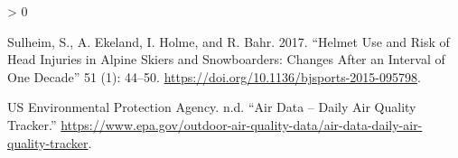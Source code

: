 \documentclass[
]{report}
\newlength{\cslhangindent}
\newenvironment{CSLReferences}[2] %
 {%
  \setlength{\parindent}{0pt}
  \ifodd #1 \everypar{\setlength{\hangindent}{\cslhangindent}}\ignorespaces\fi
  \ifnum #2 > 0
  \setlength{\parskip}{#2\baselineskip}
  \fi
 }%
 {}
\begin{document}
\begin{CSLReferences}{1}{0}
\leavevmode\hypertarget{ref-sulheim2017}{}%
Sulheim, S., A. Ekeland, I. Holme, and R. Bahr. 2017. {``Helmet Use and Risk of Head Injuries in Alpine Skiers and Snowboarders: Changes After an Interval of One Decade''} 51 (1): 44--50. \url{https://doi.org/10.1136/bjsports-2015-095798}.

\leavevmode\hypertarget{ref-usepa2020}{}%
US Environmental Protection Agency. n.d. {``Air Data -- Daily Air Quality Tracker.''} \url{https://www.epa.gov/outdoor-air-quality-data/air-data-daily-air-quality-tracker}.

\end{CSLReferences}
\end{document}
